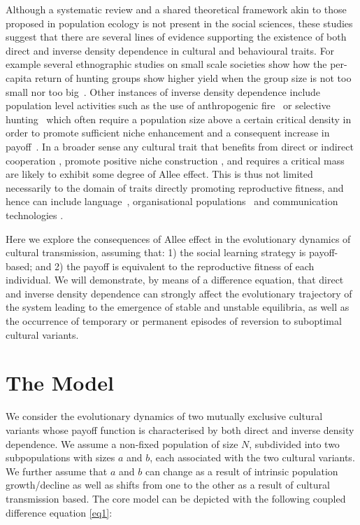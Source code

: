 \documentclass[preprint,authoryear]{elsarticle}
\begin{document}
Although a systematic review and a shared theoretical framework akin to those proposed in population ecology \citep{kramer_etal_2009} is not present in the social sciences, these studies suggest that there are several lines of evidence supporting the existence of both direct and inverse density dependence in cultural and behavioural traits. For example several ethnographic studies on small scale societies show how the per-capita return of hunting groups show higher yield when the group size is not too small nor too big~\citep{hill_and_hawkes_1983,janssen_and_hill_2014}. Other instances of inverse density dependence include population level activities such as the use of anthropogenic fire~\citep{bird2013} or selective hunting~\citep{dods_2002} which often require a population size above a certain critical density in order to promote sufficient niche enhancement and a consequent increase in payoff~\citep{rowley-conwy_and_layton_2011}. In a broader sense any cultural trait that benefits from direct or indirect cooperation \citep{}, promote positive niche construction \citep{vandermeer_2008}, and requires a critical mass \citep{rogers_2003} are likely to exhibit some degree of Allee effect. This is thus not limited necessarily to the domain of traits directly promoting reproductive fitness, and hence can include language~\citep{kandler2009}, organisational populations~\citep{caroll_and_hannan_1989} and communication technologies \citep{van_slyke_perceived_2007}.

Here we explore the consequences of Allee effect in the evolutionary dynamics of cultural transmission, assuming that: 1) the social learning strategy is payoff-based; and 2)  the payoff is equivalent to the reproductive fitness of each individual. We will demonstrate, by means of a difference equation, that direct and inverse density dependence can strongly affect the evolutionary trajectory of the system leading to the emergence of stable and unstable equilibria, as well as the occurrence of temporary or permanent episodes of reversion to suboptimal cultural variants. 

\section{The Model}
We consider the evolutionary dynamics of two mutually exclusive cultural variants whose payoff function is characterised by both direct and inverse density dependence. We assume a non-fixed population of size $N$, subdivided into two subpopulations with sizes $a$ and $b$, each associated with the two cultural variants. We further assume that $a$ and $b$ can change as a result of intrinsic population growth/decline as well as shifts from one to the other as a result of cultural transmission based. The core model can be depicted with the following coupled difference equation \eqref{eq1}:
\end{document}
